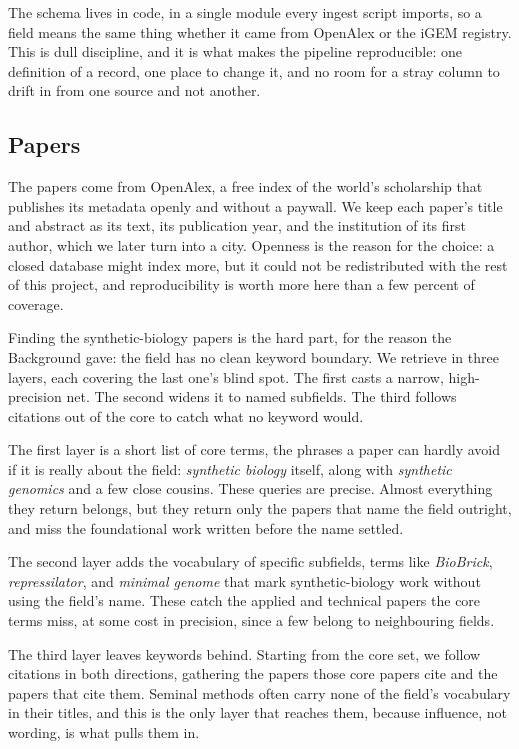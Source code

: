 \documentclass[12pt,a4paper]{article}
\begin{document}
	The schema lives in code, in a single module every ingest script imports, so a
	field means the same thing whether it came from OpenAlex or the iGEM registry.
	This is dull discipline, and it is what makes the pipeline reproducible: one
	definition of a record, one place to change it, and no room for a stray column to
	drift in from one source and not another.
	
	\subsection{Papers}
	
	The papers come from OpenAlex, a free index of the world's scholarship that
	publishes its metadata openly and without a paywall. We keep each paper's title
	and abstract as its text, its publication year, and the institution of its first
	author, which we later turn into a city. Openness is the reason for the choice: a
	closed database might index more, but it could not be redistributed with the rest
	of this project, and reproducibility is worth more here than a few percent of
	coverage.
	
	Finding the synthetic-biology papers is the hard part, for the reason the
	Background gave: the field has no clean keyword boundary. We retrieve in three
	layers, each covering the last one's blind spot. The first casts a narrow,
	high-precision net. The second widens it to named subfields. The third follows
	citations out of the core to catch what no keyword would.
	
	The first layer is a short list of core terms, the phrases a paper can hardly
	avoid if it is really about the field: \textit{synthetic biology} itself, along
	with \textit{synthetic genomics} and a few close cousins. These queries are
	precise. Almost everything they return belongs, but they return only the papers
	that name the field outright, and miss the foundational work written before the
	name settled.
	
	The second layer adds the vocabulary of specific subfields, terms like
	\textit{BioBrick}, \textit{repressilator}, and \textit{minimal genome} that mark
	synthetic-biology work without using the field's name. These catch the applied and
	technical papers the core terms miss, at some cost in precision, since a few
	belong to neighbouring fields.
	
	The third layer leaves keywords behind. Starting from the core set, we follow
	citations in both directions, gathering the papers those core papers cite and the
	papers that cite them. Seminal methods often carry none of the field's vocabulary
	in their titles, and this is the only layer that reaches them, because influence,
	not wording, is what pulls them in.
	
\end{document}
